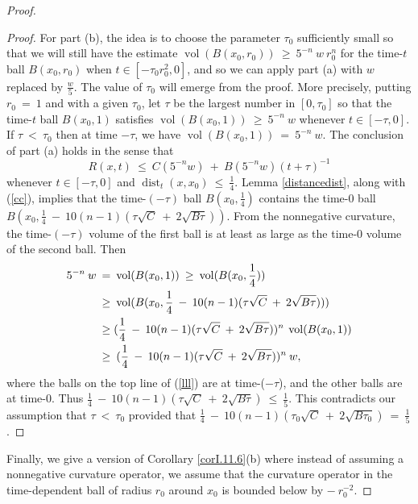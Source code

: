 \documentclass[12pt]{amsart}
\newcommand{\dist}{\operatorname{dist}}
\newcommand{\vol}{\operatorname{vol}}
\numberwithin{equation}{section}
\theoremstyle{plain}
\theoremstyle{definition}
\theoremstyle{remark}
\begin{document}
\begin{proof}
\begin{proof}
For part (b), the idea is to choose the parameter 
$\tau_0$ sufficiently small so that
we will still have the estimate 
$\vol(B(x_0, r_0)) \: \ge \: 5^{-n} \: w \: r_0^n$ for the time-$t$ ball
$B(x_0, r_0)$ when $t \in [-\tau_0 r_0^2, 0]$,
and so we can apply part (a) with $w$ replaced by $\frac{w}{5}$.
The value of $\tau_0$ will emerge from the proof.
More precisely, putting $r_0 \: = \: 1$ and with a given 
$\tau_0$, let $\tau$ be the
largest number in $[0, \tau_0]$ so that the time-$t$ ball
$B(x_0, 1)$ satisfies
$\vol(B(x_0, 1)) \: \ge \: 5^{-n} \: w$ whenever $t \in [-\tau, 0]$.
If $\tau \: < \: \tau_0$ then at time $- \tau$, we have
$\vol(B(x_0, 1)) \: = \: 5^{-n} \: w$.
The conclusion of part (a) holds in the sense that
\begin{equation} \label{cc}
R(x, t) \: \le \: C(5^{-n} w) \: + \: B(5^{-n} w) ( t + \tau)^{-1}
\end{equation}
whenever $t \in [- \tau, 0]$ and $\dist_t(x, x_0) \: \le \: \frac14$.
Lemma \ref{distancedist}, along with (\ref{cc}), implies that the 
time-$(- \tau)$ ball $B(x_0, \frac14)$ contains the
time-$0$ ball $B(x_0, \frac14 \: - \: 10(n-1)(\tau \sqrt{C} \: + \:
2 \sqrt{B \tau}))$. From the nonnegative curvature, the 
time-$(- \tau)$ volume of the first ball is at least as large as the
time-$0$ volume of the second ball.  Then
\begin{align} \label{lll}
5^{-n} \: w \: & = \: \vol(B(x_0, 1)) 
\: \ge \: \vol(B(x_0, \frac14)) \\
& \ge \: 
\vol(B(x_0, \frac14 \: - \: 10(n-1)(\tau \sqrt{C} \: + \:
2 \sqrt{B \tau}))) \notag \\
& \ge 
(\frac14 \: - \: 10(n-1)(\tau \sqrt{C} \: + \:
2 \sqrt{B \tau}))^n \: \vol(B(x_0, 1)) \notag \\
& \ge \:
(\frac14 \: - \: 10(n-1)(\tau \sqrt{C} \: + \:
2 \sqrt{B \tau}))^n \: w, \notag
\end{align}
where the balls on the top line of (\ref{lll}) are at time-($- \tau$),
and the other balls are at time-$0$. 
Thus $\frac14 \: - \: 10(n-1)(\tau \sqrt{C} \: + \:
2 \sqrt{B \tau}) \: \le \: \frac15$.
This contradicts our assumption
that $\tau \: < \: \tau_0$ provided that
$\frac14 \: - \: 10(n-1)(\tau_0 \sqrt{C} \: + \:
2 \sqrt{B \tau_0}) \: = \: \frac15$.
\end{proof}

Finally, we give a version of Corollary \ref{corI.11.6}(b)  where instead of assuming a
nonnegative curvature operator, we assume that the 
curvature operator
in the time-dependent ball of radius $r_0$ around $x_0$ is bounded below by
$- \: r_0^{-2}$.



\end{proof}
\end{document}
